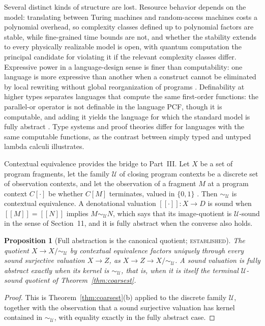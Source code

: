 \documentclass[11pt]{article}
\newtheorem{proposition}[theorem]{Proposition}
\theoremstyle{definition}
\theoremstyle{remark}
\newcommand{\stE}{\textsc{established}}
\newcommand{\cU}{\mathcal U}
\newcommand{\sk}{\sim}
\begin{document}
Several distinct kinds of structure are lost. Resource behavior depends on the model: translating between Turing machines and random-access machines costs a polynomial overhead, so complexity classes defined up to polynomial factors are stable, while fine-grained time bounds are not, and whether the stability extends to every physically realizable model is open, with quantum computation the principal candidate for violating it if the relevant complexity classes differ. Expressive power in a language-design sense is finer than computability: one language is more expressive than another when a construct cannot be eliminated by local rewriting without global reorganization of programs \cite{felleisen}. Definability at higher types separates languages that compute the same first-order functions: the parallel-or operator is not definable in the language PCF, though it is computable, and adding it yields the language for which the standard model is fully abstract \cite{plotkin}. Type systems and proof theories differ for languages with the same computable functions, as the contrast between simply typed and untyped lambda calculi illustrates.

Contextual equivalence provides the bridge to Part~III. Let $X$ be a set of program fragments, let the family $\cU$ of closing program contexts be a discrete set of observation contexts, and let the observation of a fragment $M$ at a program context $C[\cdot]$ be whether $C[M]$ terminates, valued in $\{0,1\}$ \cite{morris}. Then $\sk_\cU$ is contextual equivalence. A denotational valuation $[\![\cdot]\!]:X\to D$ is sound when $[\![M]\!]=[\![N]\!]$ implies $M\sk_\cU N$, which says that its image-quotient is $\cU$-sound in the sense of Section~11, and it is fully abstract when the converse also holds.

\begin{proposition}[Full abstraction is the canonical quotient; \stE]\label{prop:fullabs}
The quotient $X\to X/{\sk_\cU}$ by contextual equivalence factors uniquely through every sound surjective valuation $X\to Z$, as $X\to Z\to X/{\sk_\cU}$. A sound valuation is fully abstract exactly when its kernel is $\sk_\cU$, that is, when it is itself the terminal $\cU$-sound quotient of Theorem~\ref{thm:coarsest}.
\end{proposition}
\begin{proof}
This is Theorem~\ref{thm:coarsest}(b) applied to the discrete family $\cU$, together with the observation that a sound surjective valuation has kernel contained in $\sk_\cU$, with equality exactly in the fully abstract case.
\end{proof}
\end{document}
